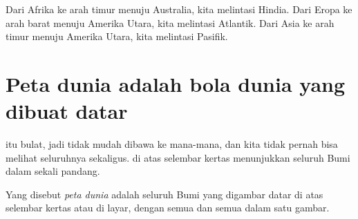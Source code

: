 \begin{example}\label{ex:g3:continents-and-oceans:africa-australia}
Dari Afrika ke arah timur menuju Australia, kita melintasi  Hindia.
Dari Eropa ke arah barat menuju Amerika Utara, kita melintasi 
Atlantik. Dari Asia ke arah timur menuju Amerika Utara, kita melintasi
 Pasifik.
\end{example}

\section{Peta dunia adalah bola dunia yang dibuat datar}

 itu bulat, jadi tidak mudah dibawa ke mana-mana, dan kita tidak
pernah bisa melihat seluruhnya sekaligus.  di atas selembar kertas
menunjukkan seluruh Bumi dalam sekali pandang.

\begin{definition}\label{def:g3:continents-and-oceans:world-map}
Yang disebut \emph{peta dunia} adalah  seluruh Bumi
yang digambar datar di atas selembar kertas atau di layar, dengan semua
 dan semua  dalam satu gambar.
\end{definition}

